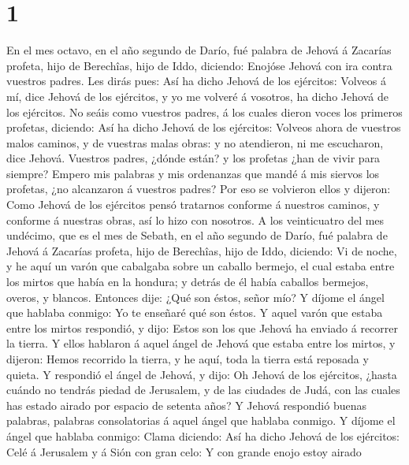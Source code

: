 \hypertarget{section}{%
\section{1}\label{section}}

 En el mes octavo, en el año segundo de Darío, fué palabra
de Jehová á Zacarías profeta, hijo de Berechîas, hijo de Iddo, diciendo:
 Enojóse Jehová con ira contra vuestros padres.
 Les dirás pues: Así ha dicho Jehová de los ejércitos:
Volveos á mí, dice Jehová de los ejércitos, y yo me volveré á vosotros,
ha dicho Jehová de los ejércitos.  No seáis como vuestros
padres, á los cuales dieron voces los primeros profetas, diciendo: Así
ha dicho Jehová de los ejércitos: Volveos ahora de vuestros malos
caminos, y de vuestras malas obras: y no atendieron, ni me escucharon,
dice Jehová.  Vuestros padres, ¿dónde están? y los
profetas ¿han de vivir para siempre?  Empero mis palabras
y mis ordenanzas que mandé á mis siervos los profetas, ¿no alcanzaron á
vuestros padres? Por eso se volvieron ellos y dijeron: Como Jehová de
los ejércitos pensó tratarnos conforme á nuestros caminos, y conforme á
nuestras obras, así lo hizo con nosotros.  A los
veinticuatro del mes undécimo, que es el mes de Sebath, en el año
segundo de Darío, fué palabra de Jehová á Zacarías profeta, hijo de
Berechîas, hijo de Iddo, diciendo:  Vi de noche, y he aquí
un varón que cabalgaba sobre un caballo bermejo, el cual estaba entre
los mirtos que había en la hondura; y detrás de él había caballos
bermejos, overos, y blancos.  Entonces dije: ¿Qué son
éstos, señor mío? Y díjome el ángel que hablaba conmigo: Yo te enseñaré
qué son éstos.  Y aquel varón que estaba entre los mirtos
respondió, y dijo: Estos son los que Jehová ha enviado á recorrer la
tierra.  Y ellos hablaron á aquel ángel de Jehová que
estaba entre los mirtos, y dijeron: Hemos recorrido la tierra, y he
aquí, toda la tierra está reposada y quieta.  Y respondió
el ángel de Jehová, y dijo: Oh Jehová de los ejércitos, ¿hasta cuándo no
tendrás piedad de Jerusalem, y de las ciudades de Judá, con las cuales
has estado airado por espacio de setenta años?  Y Jehová
respondió buenas palabras, palabras consolatorias á aquel ángel que
hablaba conmigo.  Y díjome el ángel que hablaba conmigo:
Clama diciendo: Así ha dicho Jehová de los ejércitos: Celé á Jerusalem y
á Sión con gran celo:  Y con grande enojo estoy airado
